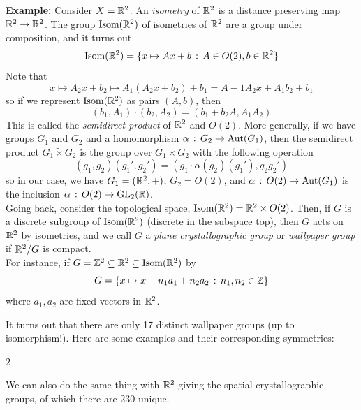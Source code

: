 \begin{example}{\textbf{Example:}}
    Consider $X = \mathbb{R}^2$. An \emph{isometry} of $\mathbb{R}^2$ is a distance preserving map $\mathbb{R}^2 \to \mathbb{R}^2$. The group $\text{Isom}(\mathbb{R}^2)$ of isometries of $\mathbb{R}^2$ are a group under composition, and it turns out
    \[ \text{Isom}(\mathbb{R}^2) = \{x \mapsto Ax + b \, :\, A \in O(2), b \in \mathbb{R}^2\} \]
    Note that
    \[ x \mapsto A_2x + b_2 \mapsto A_1(A_2x + b_2) + b_1 = A-1A_2x + A_1b_2 + b_1 \]
    so if we represent $\text{Isom}(\mathbb{R}^2)$ as pairs $(A, b)$, then
    \[ (b_1, A_1) \cdot (b_2, A_2) = (b_1 + b_2A, A_1A_2) \]
    This is called the \emph{semidirect product} of $\mathbb{R}^2$ and $O(2)$. More generally, if we have groups $G_1$ and $G_2$ and a homomorphism $\alpha \, :\, G_2 \to \text{Aut}(G_1)$, then the semidirect product $G_1 \tilde{\times} G_2$ is the group over $G_1 \times G_2$ with the following operation
    \[ (g_1, g_2)(g_1', g_2') = (g_1 \cdot \alpha(g_2)(g_1'), g_2g_2') \]
    so in our case, we have $G_1 = (\mathbb{R}^2, +)$, $G_2 = O(2)$, and $\alpha \, :\, O(2) \to \text{Aut}(G_1)$ is the inclusion $\alpha \, :\, O(2) \to \text{GL}_{2}(\mathbb{R})$.\\

    Going back, consider the topological space, $\text{Isom}(\mathbb{R}^2) = \mathbb{R}^2 \times O(2)$. Then, if $G$ is a discrete subgroup of $\text{Isom}(\mathbb{R}^2)$ (discrete in the subspace top), then $G$ acts on $\mathbb{R}^2$ by isometries, and we call $G$ a \emph{plane crystallographic group} or \emph{wallpaper group} if $\mathbb{R}^2/G$ is compact.\\

    For instance, if $G = \mathbb{Z}^2 \subseteq \mathbb{R}^2 \subseteq \text{Isom}(\mathbb{R}^2)$ by
    \[ G = \{x \mapsto x + n_1a_1 + n_2a_2 \, :\, n_1, n_2 \in \mathbb{Z}\} \]
    where $a_1, a_2$ are fixed vectors in $\mathbb{R}^2$. \\


    It turns out that there are only 17 distinct wallpaper groups (up to isomorphism!). Here are some examples and their corresponding symmetries:
    \begin{multicols}{2}
        \columnbreak

    \end{multicols}
    
    We can also do the same thing with $\mathbb{R}^2$ giving the spatial crystallographic groups, of which there are 230 unique. 
\end{example}

